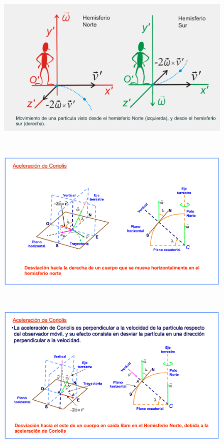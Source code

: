 \begin{figure}[H]
	\centering
	\includegraphics[width=1\textwidth]{imagenes/imagenes10/T10IM12.png}
\end{figure}

$\quad$

\begin{figure}[H]
	\centering
	\includegraphics[width=1\textwidth]{imagenes/imagenes10/T10IM13.png}
\end{figure}

$\quad$



\begin{figure}[H]
	\centering
	\includegraphics[width=1\textwidth]{imagenes/imagenes10/T10IM14.png}
\end{figure}
$\quad$

